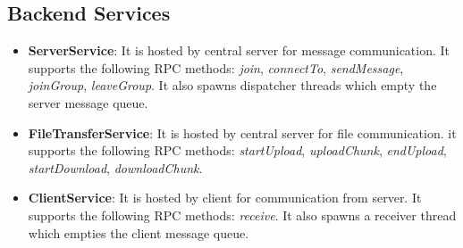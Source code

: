 \documentclass[a4paper,10pt]{article}
\begin{document}
\subsection{Backend Services}
\begin{itemize}
    \item \textbf{ServerService}: It is hosted by central server for message communication. It supports the following RPC methods: \textit{join}, \textit{connectTo}, \textit{sendMessage}, \textit{joinGroup}, \textit{leaveGroup}. It also spawns dispatcher threads which empty the server message queue.
    \item \textbf{FileTransferService}: It is hosted by central server for file communication. it supports the following RPC methods: \textit{startUpload}, \textit{uploadChunk}, \textit{endUpload}, \textit{startDownload}, \textit{downloadChunk}.
    \item \textbf{ClientService}: It is hosted by client for communication from server. It supports the following RPC methods: \textit{receive}. It also spawns a receiver thread which empties the client message queue.
\end{itemize}
\end{document}
